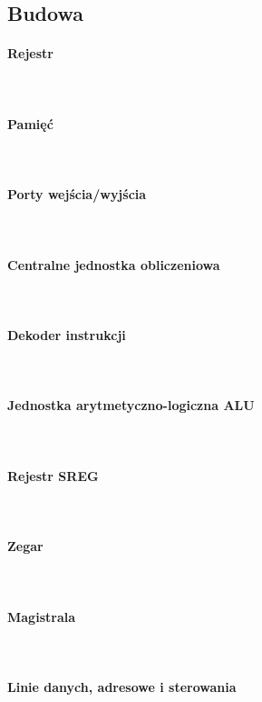 \documentclass[12p]{article}
\begin{document}
\subsection{Budowa }
\paragraph{Rejestr} \mbox{} \\ %
\paragraph{Pamięć} \mbox{} \\%
\paragraph{Porty wejścia/wyjścia} \mbox{} \\
\paragraph{Centralne jednostka obliczeniowa} \mbox{} \\
\paragraph{Dekoder instrukcji} \mbox{} \\
\paragraph{Jednostka arytmetyczno-logiczna ALU} \mbox{} \\
\paragraph{Rejestr SREG} \mbox{} \\
\paragraph{Zegar} \mbox{} \\
\paragraph{Magistrala} \mbox{} \\
\paragraph{Linie danych, adresowe i sterowania} \mbox{} \\
\end{document}
